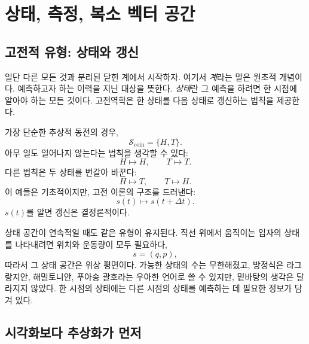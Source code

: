 \chapter{상태, 측정, 복소 벡터 공간}


\section{고전적 유형: 상태와 갱신}

일단 다른 모든 것과 분리된 닫힌 계에서 시작하자. 여기서 \emph{계}라는 말은 원초적 개념이다. 예측하고자 하는 이력을 지닌 대상을 뜻한다. \emph{상태}란 그 예측을 하려면 한 시점에 알아야 하는 모든 것이다. 고전역학은 한 상태를 다음 상태로 갱신하는 법칙을 제공한다.

가장 단순한 추상적 동전의 경우,
\begin{equation}
  \mathcal S_{\mathrm{coin}}=\{H,T\}.
\end{equation}
아무 일도 일어나지 않는다는 법칙을 생각할 수 있다:
\begin{equation}
  H\longmapsto H,
  \qquad
  T\longmapsto T.
\end{equation}
다른 법칙은 두 상태를 번갈아 바꾼다:
\begin{equation}
  H\longmapsto T,
  \qquad
  T\longmapsto H.
\end{equation}
이 예들은 기초적이지만, 고전 이론의 구조를 드러낸다:
\begin{equation}
  s(t)\longmapsto s(t+\Delta t).
\end{equation}
\(s(t)\)를 알면 갱신은 결정론적이다.

상태 공간이 연속적일 때도 같은 유형이 유지된다. 직선 위에서 움직이는 입자의 상태를 나타내려면 위치와 운동량이 모두 필요하다,
\begin{equation}
  s=(q,p),
\end{equation}
따라서 그 상태 공간은 위상 평면이다. 가능한 상태의 수는 무한해졌고, 방정식은 라그랑지안, 해밀토니안, 푸아송 괄호라는 우아한 언어로 쓸 수 있지만, 밑바탕의 생각은 달라지지 않았다. 한 시점의 상태에는 다른 시점의 상태를 예측하는 데 필요한 정보가 담겨 있다.

\section{시각화보다 추상화가 먼저}

